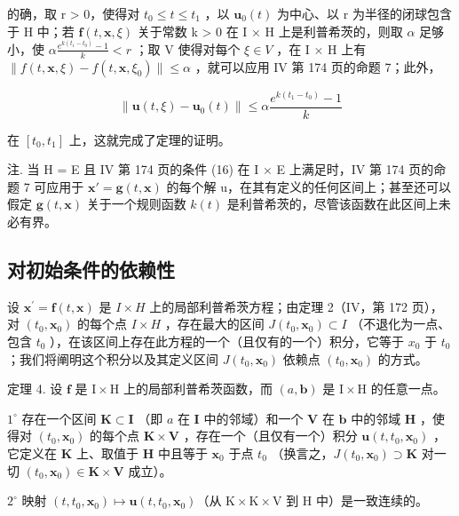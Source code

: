 的确，取 r \textgreater{} 0，使得对 \(t_{0} \leqslant t \leqslant t_{1}\) ，以 \(\mathbf{u}_{0}(t)\) 为中心、以 r 为半径的闭球包含于 H 中；若 \(\mathbf{f}(t, \mathbf{x}, \xi)\) 关于常数 k \textgreater{} 0 在 I × H 上是利普希茨的，则取 \(\alpha\) 足够小，使 \(\alpha \frac{e^{k(t_{1}-t_{0})} - 1}{k} < r\) ；取 V 使得对每个 \(\xi \in V\) ，在 I × H 上有 \(\|f(t, \mathbf{x}, \xi) - f(t, \mathbf{x}, \xi_{0})\| \leqslant \alpha\) ，就可以应用 IV 第 174 页的命题 7；此外，

\[
\| \mathbf {u} (t, \xi) - \mathbf {u} _ {0} (t) \| \leqslant \alpha \frac {e ^ {k \left(t _ {1} - t _ {0}\right)} - 1}{k}
\]

在 \([t_{0}, t_{1}]\) 上，这就完成了定理的证明。

注. 当 H = E 且 IV 第 174 页的条件 (16) 在 I × E 上满足时，IV 第 174 页的命题 7 可应用于 \(\mathbf{x}' = \mathbf{g}(t, \mathbf{x})\) 的每个解 u，在其有定义的任何区间上；甚至还可以假定 \(\mathbf{g}(t,\mathbf{x})\) 关于一个规则函数 \(k(t)\) 是利普希茨的，尽管该函数在此区间上未必有界。

\subsection{对初始条件的依赖性}

设 \(\mathbf{x}^{\prime}=\mathbf{f}(t,\mathbf{x})\) 是 \(I\times H\) 上的局部利普希茨方程；由定理 2（IV，第 172 页），对 \((t_{0},\mathbf{x}_{0})\) 的每个点 \(I\times H\) ，存在最大的区间 \(J(t_{0},\mathbf{x}_{0})\subset I\) （不退化为一点、包含 \(t_{0}\) ），在该区间上存在此方程的一个（且仅有的一个）积分，它等于 \(x_{0}\) 于 \(t_{0}\) ；我们将阐明这个积分以及其定义区间 \(J(t_{0},\mathbf{x}_{0})\) 依赖点 \((t_{0},\mathbf{x}_{0})\) 的方式。

定理 4. 设 \(\mathbf{f}\) 是 \(\mathrm{I} \times \mathrm{H}\) 上的局部利普希茨函数，而 \((a, \mathbf{b})\) 是 \(\mathrm{I} \times \mathrm{H}\) 的任意一点。

\(1^{\circ}\) 存在一个区间 \(\mathbf{K} \subset \mathbf{I}\) （即 \(a\) 在 \(\mathbf{I}\) 中的邻域）和一个 \(\mathbf{V}\) 在 \(\mathbf{b}\) 中的邻域 \(\mathbf{H}\) ，使得对 \((t_0, \mathbf{x}_0)\) 的每个点 \(\mathbf{K} \times \mathbf{V}\) ，存在一个（且仅有一个）积分 \(\mathbf{u}(t, t_0, \mathbf{x}_0)\) ，它定义在 \(\mathbf{K}\) 上、取值于 \(\mathbf{H}\) 中且等于 \(\mathbf{x}_0\) 于点 \(t_0\) （换言之，\(J(t_0, \mathbf{x}_0) \supset \mathbf{K}\) 对一切 \((t_0, \mathbf{x}_0) \in \mathbf{K} \times \mathbf{V}\) 成立）。

\(2^{\circ}\) 映射 \((t,t_0,\mathbf{x}_0)\mapsto \mathbf{u}(t,t_0,\mathbf{x}_0)\)（从 \(\mathrm{K}\times \mathrm{K}\times \mathrm{V}\) 到 H 中）是一致连续的。

